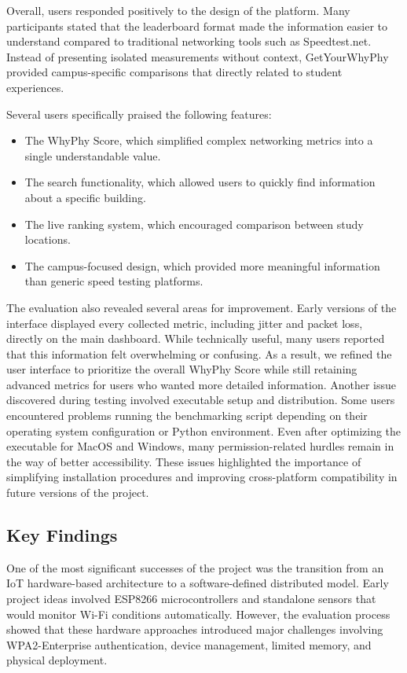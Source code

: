 \documentclass[sigconf]{acmart}
\begin{document}
Overall, users responded positively to the design of the platform. Many participants stated that the leaderboard format made the information easier to understand compared to traditional networking tools such as Speedtest.net. Instead of presenting isolated measurements without context, GetYourWhyPhy provided campus-specific comparisons that directly related to student experiences.

Several users specifically praised the following features:
\begin{itemize}
\item {\texttt{}}The WhyPhy Score, which simplified complex networking metrics into a single understandable value.
\item {\texttt{}}The search functionality, which allowed users to quickly find information about a specific building.
\item {\texttt{}}The live ranking system, which encouraged comparison between study locations.
\item {\texttt{}}The campus-focused design, which provided more meaningful information than generic speed testing platforms.
\end{itemize}

The evaluation also revealed several areas for improvement. Early versions of the interface displayed every collected metric, including jitter and packet loss, directly on the main dashboard. While technically useful, many users reported that this information felt overwhelming or confusing. As a result, we refined the user interface to prioritize the overall WhyPhy Score while still retaining advanced metrics for users who wanted more detailed information.
Another issue discovered during testing involved executable setup and distribution. Some users encountered problems running the benchmarking script depending on their operating system configuration or Python environment. Even after optimizing the executable for MacOS and Windows, many permission-related hurdles remain in the way of better accessibility. These issues highlighted the importance of simplifying installation procedures and improving cross-platform compatibility in future versions of the project.

\subsection{Key Findings}
One of the most significant successes of the project was the transition from an IoT hardware-based architecture to a software-defined distributed model. Early project ideas involved ESP8266 microcontrollers and standalone sensors that would monitor Wi-Fi conditions automatically. However, the evaluation process showed that these hardware approaches introduced major challenges involving WPA2-Enterprise authentication, device management, limited memory, and physical deployment.
\end{document}

